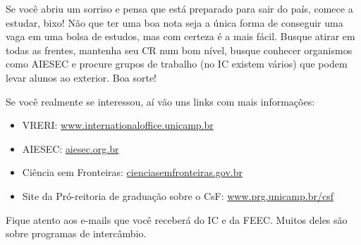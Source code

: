 Se você abriu um sorriso e pensa que está preparado para sair do país, comece a
estudar, bixo! Não que ter uma boa nota seja a única forma de conseguir uma vaga
em uma bolsa de estudos, mas com certeza é a mais fácil.  Busque atirar em todas
as frentes, mantenha seu CR num bom nível, busque conhecer organismos como
AIESEC e procure grupos de trabalho (no IC existem vários) que podem levar
alunos ao exterior. Boa sorte!

Se você realmente se interessou, aí vão uns links com mais informações:

\begin{itemize}
    \item  VRERI: \url{www.internationaloffice.unicamp.br}
    \item  AIESEC: \url{aiesec.org.br}
    \item  Ciência sem Fronteiras: \url{cienciasemfronteiras.gov.br}
    \item  Site da Pró-reitoria de graduação sobre o CsF: \url{www.prg.unicamp.br/csf}
\end{itemize}

Fique atento aos e-mails que você receberá do IC e da FEEC. Muitos deles são
sobre programas de intercâmbio.
